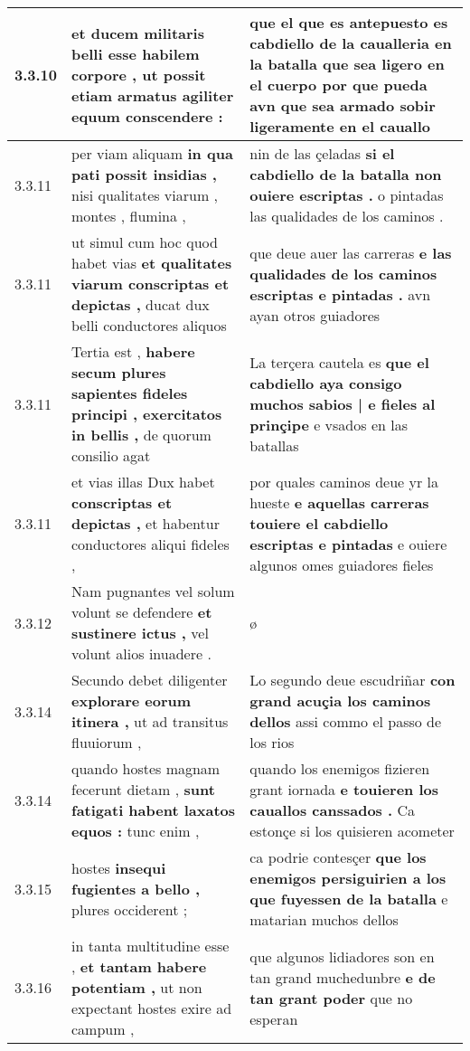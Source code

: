 \begin{tabular}{|p{1cm}|p{6.5cm}|p{6.5cm}|}
3.3.10 & et ducem militaris belli \textbf{ esse habilem corpore , } ut possit etiam armatus agiliter equum conscendere : & que el que es antepuesto es cabdiello de la caualleria en la batalla \textbf{ que sea ligero en el cuerpo } por que pueda avn que sea armado sobir ligeramente en el cauallo \\\hline
3.3.11 & per viam aliquam \textbf{ in qua pati possit insidias , } nisi qualitates viarum , montes , flumina , & nin de las çeladas \textbf{ si el cabdiello de la batalla non ouiere escriptas . } o pintadas las qualidades de los caminos . \\\hline
3.3.11 & ut simul cum hoc quod habet vias \textbf{ et qualitates viarum conscriptas et depictas , } ducat dux belli conductores aliquos & que deue auer las carreras \textbf{ e las qualidades de los caminos escriptas e pintadas . } avn ayan otros guiadores \\\hline
3.3.11 & Tertia est , \textbf{ habere secum plures sapientes fideles principi , exercitatos in bellis , } de quorum consilio agat & La terçera cautela es \textbf{ que el cabdiello aya consigo muchos sabios | e fieles al prinçipe } e vsados en las batallas \\\hline
3.3.11 & et vias illas Dux habet \textbf{ conscriptas et depictas , } et habentur conductores aliqui fideles , & por quales caminos deue yr la hueste \textbf{ e aquellas carreras touiere el cabdiello escriptas e pintadas } e ouiere algunos omes guiadores fieles \\\hline
3.3.12 & Nam pugnantes vel solum volunt se defendere \textbf{ et sustinere ictus , } vel volunt alios inuadere . & ø \\\hline
3.3.14 & Secundo debet diligenter \textbf{ explorare eorum itinera , } ut ad transitus fluuiorum , & Lo segundo deue escudriñar \textbf{ con grand acuçia los caminos dellos } assi commo el passo de los rios \\\hline
3.3.14 & quando hostes magnam fecerunt dietam , \textbf{ sunt fatigati habent laxatos equos : } tunc enim , & quando los enemigos fizieren grant iornada \textbf{ e touieren los cauallos canssados . } Ca estonçe si los quisieren acometer \\\hline
3.3.15 & hostes \textbf{ insequi fugientes a bello , } plures occiderent ; & ca podrie contesçer \textbf{ que los enemigos persiguirien a los que fuyessen de la batalla } e matarian muchos dellos \\\hline
3.3.16 & in tanta multitudine esse , \textbf{ et tantam habere potentiam , } ut non expectant hostes exire ad campum , & que algunos lidiadores son en tan grand muchedunbre \textbf{ e de tan grant poder } que no esperan \\\hline

\end{tabular}
